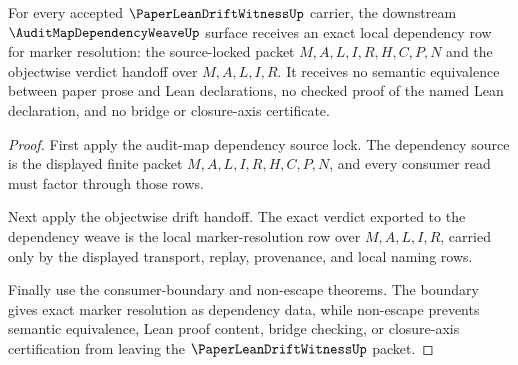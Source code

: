 \begin{theorem}
\label{thm:paper-lean-drift-witness-auditmap-weave-consumer-exactness}
For every accepted $\PaperLeanDriftWitnessUp$ carrier, the downstream $\AuditMapDependencyWeaveUp$ surface receives an exact local dependency row for marker resolution: the source-locked packet $M,A,L,I,R,H,C,P,N$ and the objectwise verdict handoff over $M,A,L,I,R$. It receives no semantic equivalence between paper prose and Lean declarations, no checked proof of the named Lean declaration, and no bridge or closure-axis certificate.
\end{theorem}
\begin{proof}
First apply the audit-map dependency source lock. The dependency source is the displayed finite packet $M,A,L,I,R,H,C,P,N$, and every consumer read must factor through those rows.

Next apply the objectwise drift handoff. The exact verdict exported to the dependency weave is the local marker-resolution row over $M,A,L,I,R$, carried only by the displayed transport, replay, provenance, and local naming rows.

Finally use the consumer-boundary and non-escape theorems. The boundary gives exact marker resolution as dependency data, while non-escape prevents semantic equivalence, Lean proof content, bridge checking, or closure-axis certification from leaving the $\PaperLeanDriftWitnessUp$ packet.
\end{proof}

